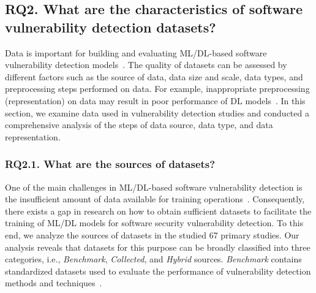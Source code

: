 \subsection{RQ2. What are the characteristics of software vulnerability detection datasets?}

Data is important for building and evaluating ML/DL-based software vulnerability detection models~\cite{lin2019software, cheng2022path, lin2018cross, du2020cross, dam2017automatic}. The quality of datasets can be assessed by different factors such as the source of data, data size and scale, data types, and preprocessing steps performed on data. For example, inappropriate preprocessing (representation) on data may result in poor performance of DL models~\cite{ruospo2020evaluating}. In this section, we examine data used in vulnerability detection studies and conducted a comprehensive analysis of the steps of data source, data type, and data representation.

\subsubsection{RQ2.1. What are the sources of datasets?}
One of the main challenges in ML/DL-based software vulnerability detection is the insufficient amount of data available for training operations~\cite{chen2020machine, lin2018cross}. Consequently, there exists a gap in research on how to obtain sufficient datasets to facilitate the training of ML/DL models for software security vulnerability detection. To this end, we analyze the sources of datasets in the studied 67 primary studies. Our analysis reveals that datasets for this purpose can be broadly classified into three categories, i.e.,  \textit{Benchmark}, \textit{Collected}, and \textit{Hybrid} sources. \textit{Benchmark} contains standardized datasets used to evaluate the performance of vulnerability detection methods and techniques~\cite{sabetta2018practical, dam2018automatic, dam2017automatic, wang2016automatically, jeon2021autovas, tian2020bvdetector, liu2020cd, yamaguchi2013chucky, liu2021combining, phan2017convolutional, nguyen2020deep, hoang2019deepjit, kronjee2018discovering, zeng2021gcn2defect, yan2021han, 3429444, 8594942, 3327890}. 

